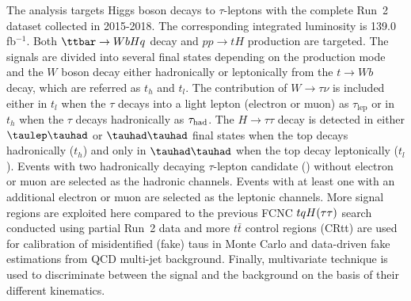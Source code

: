

The analysis targets Higgs boson decays to 
$\tau$-leptons with the complete Run~2 dataset collected in 2015-2018. The corresponding integrated luminosity is 139.0 fb$^{-1}$. Both $\ttbar \to WbHq$ decay and $pp \to tH$ production are targeted. The signals are divided into several final states depending on the production mode and
the  $W$ boson decay either hadronically or leptonically from the $t\rightarrow Wb$ decay, which are referred as $t_h$ and $t_l$. The contribution of $W\rightarrow\tau\nu$ is included either in
$t_l$ when the $\tau$ decays into a light lepton (electron or muon) as $\tau_{\text{lep}}$ or in $t_h$ when the $\tau$ decays hadronically as $\tau_\text{had}$.
The $H\rightarrow \tau\tau$ decay is detected in
either $\tlhad$ or $\thadhad$ final states when the top decays hadronically ($t_h$) and only in $\thadhad$ when the top decay leptonically ($t_l$). 
Events with two hadronically decaying $\tau$-lepton candidate (\tauhad) without electron or muon are selected as the hadronic channels. Events with at least one \tauhad with an additional electron or muon are selected as the leptonic channels. More signal regions are exploited here compared to the previous FCNC $tqH(\tau\tau)$ search conducted using partial Run~2 data and more
$t\bar{t}$ control regions (CRtt) are used for calibration of misidentified (fake) taus in Monte Carlo and data-driven fake estimations from QCD multi-jet background.
Finally, multivariate technique is used to discriminate between the signal and the background on the basis of their different kinematics. 

